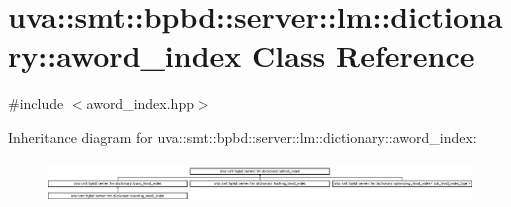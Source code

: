 \hypertarget{classuva_1_1smt_1_1bpbd_1_1server_1_1lm_1_1dictionary_1_1aword__index}{}\section{uva\+:\+:smt\+:\+:bpbd\+:\+:server\+:\+:lm\+:\+:dictionary\+:\+:aword\+\_\+index Class Reference}
\label{classuva_1_1smt_1_1bpbd_1_1server_1_1lm_1_1dictionary_1_1aword__index}


{\ttfamily \#include $<$aword\+\_\+index.\+hpp$>$}

Inheritance diagram for uva\+:\+:smt\+:\+:bpbd\+:\+:server\+:\+:lm\+:\+:dictionary\+:\+:aword\+\_\+index\+:\begin{figure}[H]
\begin{center}
\leavevmode
\includegraphics[height=1.115538cm]{classuva_1_1smt_1_1bpbd_1_1server_1_1lm_1_1dictionary_1_1aword__index}
\end{center}
\end{figure}
